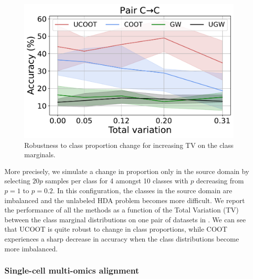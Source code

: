 \begin{figure}
  \centering
  \vspace{-10pt}
  \includegraphics[width=\linewidth]{./Chapitre3/fig/summary_C_C.pdf}
  \vspace*{-7mm}
  \caption{Robustness to class proportion change for increasing TV on the class marginals.
  \label{f:hda_prop}}
\end{figure}
More precisely, we simulate a change in proportion only in the source domain
by selecting $20p$ samples per class for 4 amongst 10 classes with $p$
decreasing from $p=1$ to $p=0.2$. In this configuration,
the classes in the source domain are imbalanced and the unlabeled HDA problem becomes more difficult.
We report the performance of all the methods as a function of the Total Variation (TV)
between the class marginal distributions on one pair of datasets in .
We can see that UCOOT is quite robust to change in class proportions,
while COOT experiences a sharp decrease in accuracy when the class distributions
become more imbalanced.

%
\subsubsection{Single-cell multi-omics alignment}

